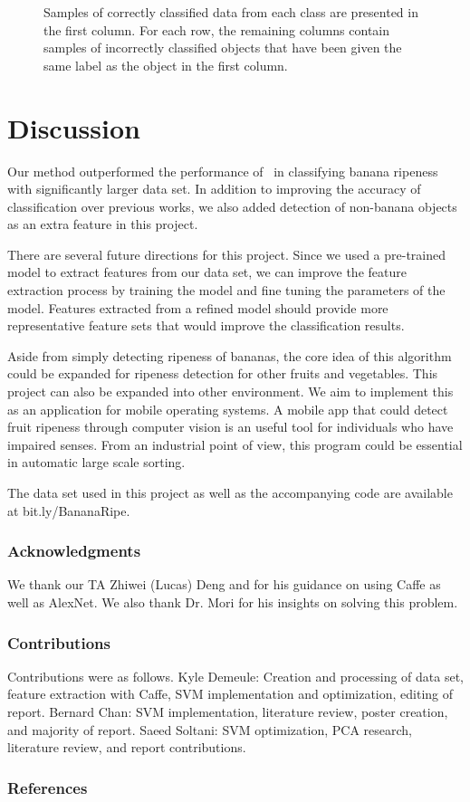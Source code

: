 \documentclass{article} %
\begin{document}
\begin{figure}[h]
\begin{subfigure}{.123\textwidth}
\captionsetup{labelformat=empty}
\caption{}
\end{subfigure}
\caption{Samples of correctly classified data from each class are presented in the first column. For each row, the remaining columns contain samples of incorrectly classified objects that have been given the same label as the object in the first column. }
\label{fig:correctVsIncorrect}
\end{figure}
\section{Discussion}
\label{sec:conclusion}

Our method outperformed  the performance of~\citet{saad2009recognizing} in classifying banana ripeness with significantly larger data set. In addition to improving the accuracy of classification over previous works, we also added detection of non-banana objects as an extra feature in this project. 

There are several future directions for this project. Since we used a pre-trained model to extract features from our data set, we can improve the feature extraction process by training the model and fine tuning the parameters of the model. Features extracted from a refined model should provide more representative feature sets that would improve the classification results.

Aside from simply detecting ripeness of bananas, the core idea of this algorithm could be expanded for ripeness detection for other fruits and vegetables. This project can also be expanded into other environment. We aim to implement this as an application for mobile operating systems. A mobile app that could detect fruit ripeness through computer vision is an useful tool for individuals who have impaired senses. From an industrial point of view, this program could be essential in automatic large scale sorting.

The data set used in this project as well as the accompanying code are available at bit.ly/BananaRipe.

\subsubsection*{Acknowledgments}
We thank our TA Zhiwei (Lucas) Deng and for his guidance on using Caffe as well as AlexNet. We also thank Dr. Mori for his insights on solving this problem. 

\subsubsection*{Contributions}
Contributions were as follows. Kyle Demeule: Creation and processing of data set, feature extraction with Caffe, SVM implementation and optimization, editing of report. Bernard Chan: SVM implementation, literature review, poster creation, and majority of report. Saeed Soltani: SVM optimization, PCA research, literature review, and report contributions.
 
\renewcommand\refname{\vskip -.75cm}
\subsubsection*{References}

   		    
   
\end{document}
